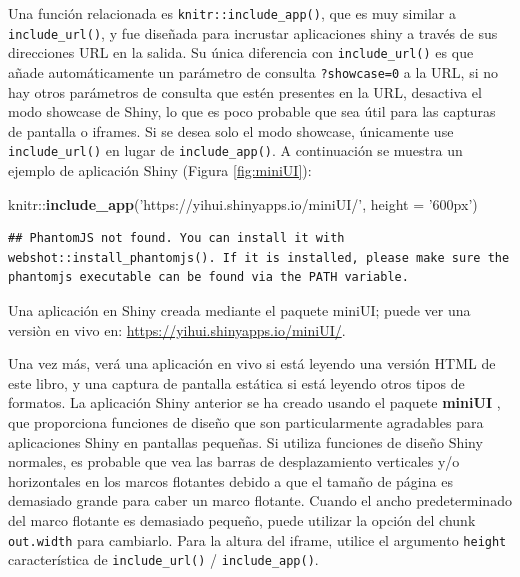 \documentclass[12pt,]{krantz}
\makeatletter
\newenvironment{Shaded}{\begin{snugshade}}{\end{snugshade}}
\newcommand{\KeywordTok}[1]{\textcolor[rgb]{0.13,0.29,0.53}{\textbf{{#1}}}}
\newcommand{\DataTypeTok}[1]{\textcolor[rgb]{0.13,0.29,0.53}{{#1}}}
\newcommand{\StringTok}[1]{\textcolor[rgb]{0.31,0.60,0.02}{{#1}}}
\newcommand{\NormalTok}[1]{{#1}}
\let\oldhref\href
\renewcommand{\href}[2]{#2\footnote{\url{#1}}}
\newenvironment{kframe}{%
\medskip{}
\setlength{\fboxsep}{.8em}
 \def\at@end@of@kframe{}%
 \ifinner\ifhmode%
  \def\at@end@of@kframe{\end{minipage}}%
  \begin{minipage}{\columnwidth}%
 \fi\fi%
 \def\FrameCommand##1{\hskip\@totalleftmargin \hskip-\fboxsep
 \colorbox{shadecolor}{##1}\hskip-\fboxsep
     \hskip-\linewidth \hskip-\@totalleftmargin \hskip\columnwidth}%
 \MakeFramed {\advance\hsize-\width
   \@totalleftmargin\z@ \linewidth\hsize
   \@setminipage}}%
 {\par\unskip\endMakeFramed%
 \at@end@of@kframe}
\renewenvironment{Shaded}{\begin{kframe}}{\end{kframe}}
\theoremstyle{definition}
\theoremstyle{definition}
\theoremstyle{remark}
\makeatother
\begin{document}
Una función relacionada es \texttt{knitr::include\_app()}, que es muy
similar a \texttt{include\_url()}, y fue diseñada para incrustar
aplicaciones shiny a través de sus direcciones URL en la salida. Su
única diferencia con \texttt{include\_url()} es que añade
automáticamente un parámetro de consulta \texttt{?showcase=0} a la URL,
si no hay otros parámetros de consulta que estén presentes en la URL,
desactiva el modo showcase de Shiny, lo que es poco probable que sea
útil para las capturas de pantalla o iframes. Si se desea solo el modo
showcase, únicamente use \texttt{include\_url()} en lugar de
\texttt{include\_app()}. A continuación se muestra un ejemplo de
aplicación Shiny (Figura \ref{fig:miniUI}):

\let\ooldhref\href
\let\href\oldhref

\begin{Shaded}
\begin{Highlighting}[]
\NormalTok{knitr::}\KeywordTok{include_app}\NormalTok{(}\StringTok{'https://yihui.shinyapps.io/miniUI/'}\NormalTok{, }\DataTypeTok{height =} \StringTok{'600px'}\NormalTok{)}
\end{Highlighting}
\end{Shaded}

\begin{verbatim}
## PhantomJS not found. You can install it with webshot::install_phantomjs(). If it is installed, please make sure the phantomjs executable can be found via the PATH variable.
\end{verbatim}

\label{fig:miniUI}Una aplicación en Shiny creada mediante el paquete miniUI;
puede ver una versiòn en vivo en:
\url{https://yihui.shinyapps.io/miniUI/}.

\let\href\ooldhref

Una vez más, verá una aplicación en vivo si está leyendo una versión
HTML de este libro, y una captura de pantalla estática si está leyendo
otros tipos de formatos. La aplicación Shiny anterior se ha creado
usando el paquete \textbf{miniUI} \citep{R-miniUI}, que proporciona
funciones de diseño que son particularmente agradables para aplicaciones
Shiny en pantallas pequeñas. Si utiliza funciones de diseño Shiny
normales, es probable que vea las barras de desplazamiento verticales
y/o horizontales en los marcos flotantes debido a que el tamaño de
página es demasiado grande para caber un marco flotante. Cuando el ancho
predeterminado del marco flotante es demasiado pequeño, puede utilizar
la opción del chunk \texttt{out.width} para cambiarlo. Para la altura
del iframe, utilice el argumento \texttt{height} característica de
\texttt{include\_url()} / \texttt{include\_app()}.
\end{document}
